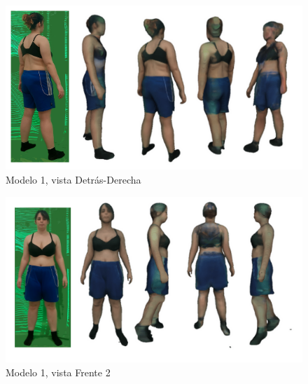 \begin{figure}[H]
	\centering
	\includegraphics[scale=0.65]{imagenes/camelia7.png}
	\caption{Modelo 1, vista Detrás-Derecha}
	\label{fig:c4}
\end{figure}
\begin{figure}[H]
	\centering
	\includegraphics[scale=0.65]{imagenes/camelia0.png}
	\caption{Modelo 1, vista Frente 2}
	\label{fig:c5}
\end{figure}

